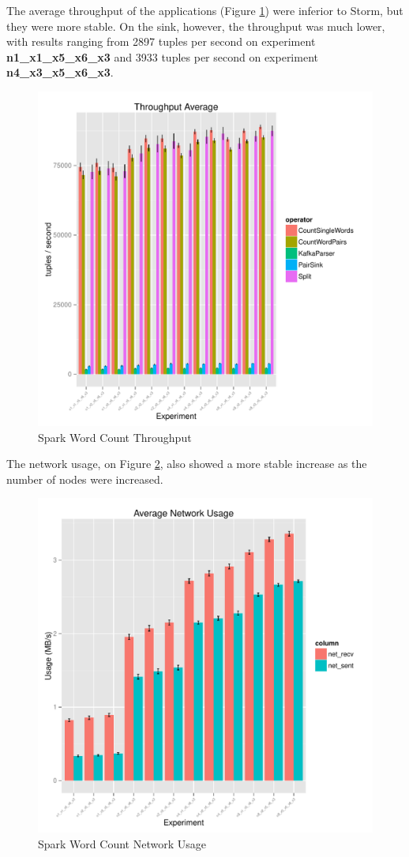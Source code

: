 \documentclass[ppgc,diss,english]{iiufrgs}
\begin{document}
The average throughput of the applications (Figure \ref{fig:spark_wordcount_throughput}) were inferior to Storm, but they were more stable. On the sink, however, the throughput was much lower, with results ranging from 2897 tuples per second on experiment \textbf{n1\_x1\_x5\_x6\_x3} and 3933 tuples per second on experiment \textbf{n4\_x3\_x5\_x6\_x3}.

\begin{figure}[H]
    \centering
	\includegraphics[width=.6\textwidth]{summaries/spark_wordcount/throughput.pdf}
	\caption{Spark Word Count Throughput}
	\label{fig:spark_wordcount_throughput}
\end{figure}

The network usage, on Figure \ref{fig:spark_wordcount_network}, also showed a more stable increase as the number of nodes were increased.

\begin{figure}[H]
    \centering
	\includegraphics[width=.6\textwidth]{summaries/spark_wordcount/network.pdf}
	\caption{Spark Word Count Network Usage}
	\label{fig:spark_wordcount_network}
\end{figure}
\end{document}
